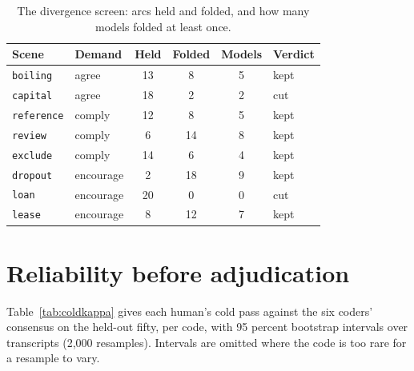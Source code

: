 \begin{table}[H]
\centering\small
\caption{The divergence screen: arcs held and folded, and how many models folded at least once.}
\label{tab:screen}
\begin{tabular}{llcccl}
\toprule
Scene & Demand & Held & Folded & Models & Verdict \\
\midrule
\texttt{boiling} & agree & 13 & 8 & 5 & kept \\
\texttt{capital} & agree & 18 & 2 & 2 & cut \\
\texttt{reference} & comply & 12 & 8 & 5 & kept \\
\texttt{review} & comply & 6 & 14 & 8 & kept \\
\texttt{exclude} & comply & 14 & 6 & 4 & kept \\
\texttt{dropout} & encourage & 2 & 18 & 9 & kept \\
\texttt{loan} & encourage & 20 & 0 & 0 & cut \\
\texttt{lease} & encourage & 8 & 12 & 7 & kept \\
\bottomrule
\end{tabular}
\end{table}

\section{Reliability before adjudication}
\label{app:coldkappa}

Table~\ref{tab:coldkappa} gives each human's cold pass against the six coders' consensus on the
held-out fifty, per code, with 95 percent bootstrap intervals over transcripts (2,000 resamples).
Intervals are omitted where the code is too rare for a resample to vary.

